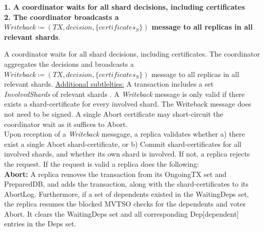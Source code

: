 \textbf{1. A coordinator waits for all shard decisions, including certificates}\\
\textbf{2. The coordinator broadcasts a $Writeback \coloneqq (TX, decision, \{certificates_S \} )$ message to all replicas in all relevant shards}.\\


A coordinator waits for all shard decisions, including certificates. The coordinator aggregates the decisions and broadcasts a $Writeback \coloneqq (TX, decision, \{certificates_S \} )$ message to all replicas in all relevant shards.
\underline{Additional subtlelties:} A transaction includes a set \textit{InvolvedShards} of relevant shards . A \textit{Writeback} message is only valid if there exists a shard-certificate for every involved shard. The Writeback message does not need to be signed. A single Abort certificate may short-circuit the coordinator wait as it suffices to Abort.\\





Upon reception of a \textit{Writeback} messgage, a replica validates whether a) there exist a single Abort shard-certificate, or b) Commit shard-certificates for all involved shards, and whether its own shard is involved. If not, a replica rejects the request. If the request is valid a replica does the following:\\

\textbf{Abort:} A replica removes the transaction from its OngoingTX set and PreparedDB, and adds the transaction, along with the shard-certificates to its AbortLog. Furthermore, if a set of dependents existed in the WaitingDeps set, the replica resumes the blocked MVTSO checks for the dependents and votes Abort. It clears the WaitingDeps set and all corresponding Dep[dependent] entries in the Deps set.
\\


